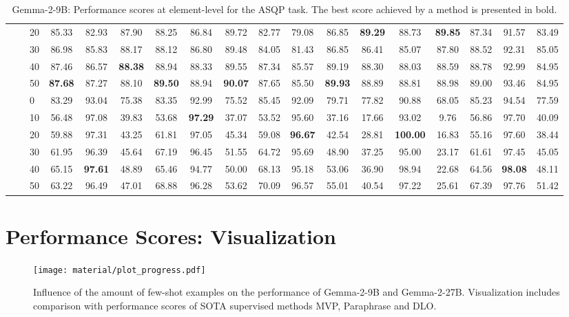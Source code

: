 \begin{table*}[!h]
{\begin{tabular}{lllccc|ccc|ccc|ccc|ccc}
 \textbf{} & \textbf{} & 20 & 85.33 & 82.93 & 87.90 & 88.25 & 86.84 & 89.72 & 82.77 & 79.08 & 86.85 & \textbf{89.29} & 88.73 & \textbf{89.85} & 87.34 & 91.57 & 83.49 \\ 
 \textbf{} & \textbf{} & 30 & 86.98 & 85.83 & 88.17 & 88.12 & 86.80 & 89.48 & 84.05 & 81.43 & 86.85 & 86.41 & 85.07 & 87.80 & 88.52 & 92.31 & 85.05 \\ 
 \textbf{} & \textbf{} & 40 & 87.46 & 86.57 & \textbf{88.38} & 88.94 & 88.33 & 89.55 & 87.34 & 85.57 & 89.19 & 88.30 & 88.03 & 88.59 & 88.78 & 92.99 & 84.95 \\ 
 \textbf{} & \textbf{} & 50 & \textbf{87.68} & 87.27 & 88.10 & \textbf{89.50} & 88.94 & \textbf{90.07} & 87.65 & 85.50 & \textbf{89.93} & 88.89 & 88.81 & 88.98 & 89.00 & 93.46 & 84.95 \\ 
 \arrayrulecolor{gray}\cline{2-18}\arrayrulecolor{black}
\textbf{} & \textbf{\multirow{6}{*}{SC}} & 0 & 83.29 & 93.04 & 75.38 & 83.35 & 92.99 & 75.52 & 85.45 & 92.09 & 79.71 & 77.82 & 90.88 & 68.05 & 85.23 & 94.54 & 77.59 \\ 
 \textbf{} & \textbf{} & 10 & 56.48 & 97.08 & 39.83 & 53.68 & \textbf{97.29} & 37.07 & 53.52 & 95.60 & 37.16 & 17.66 & 93.02 & 9.76 & 56.86 & 97.70 & 40.09 \\ 
 \textbf{} & \textbf{} & 20 & 59.88 & 97.31 & 43.25 & 61.81 & 97.05 & 45.34 & 59.08 & \textbf{96.67} & 42.54 & 28.81 & \textbf{100.00} & 16.83 & 55.16 & 97.60 & 38.44 \\ 
 \textbf{} & \textbf{} & 30 & 61.95 & 96.39 & 45.64 & 67.19 & 96.45 & 51.55 & 64.72 & 95.69 & 48.90 & 37.25 & 95.00 & 23.17 & 61.61 & 97.45 & 45.05 \\ 
 \textbf{} & \textbf{} & 40 & 65.15 & \textbf{97.61} & 48.89 & 65.46 & 94.77 & 50.00 & 68.13 & 95.18 & 53.06 & 36.90 & 98.94 & 22.68 & 64.56 & \textbf{98.08} & 48.11 \\ 
 \textbf{} & \textbf{} & 50 & 63.22 & 96.49 & 47.01 & 68.88 & 96.28 & 53.62 & 70.09 & 96.57 & 55.01 & 40.54 & 97.22 & 25.61 & 67.39 & 97.76 & 51.42 \\ 
\hline
\end{tabular}
}
\caption{Gemma-2-9B: Performance scores at element-level for the ASQP task. The best score achieved by a method is presented in bold.}\label{fig:performance-scores-element-asqp}
\end{table*}

\newpage

\section{Performance Scores: Visualization}
\label{appendix:performance-score-trends}

\begin{figure*}[!h]
    \centering
    \texttt{[image: material/plot\_progress.pdf]}
    \caption{Influence of the amount of few-shot examples on the performance of Gemma-2-9B and Gemma-2-27B. Visualization includes comparison with performance scores of SOTA supervised methods MVP, Paraphrase and DLO.}
\end{figure*}
\label{figure:performance-score-trends}